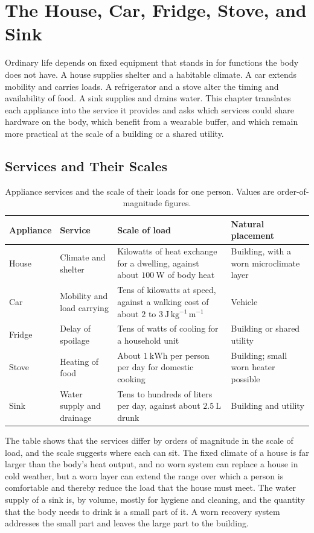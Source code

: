 \documentclass[11pt,openany]{book}
\theoremstyle{definition}
\theoremstyle{remark}
\begin{document}
\chapter{The House, Car, Fridge, Stove, and Sink}
\label{ch:appliances}

Ordinary life depends on fixed equipment that stands in for functions the body does not have. A house supplies shelter and a habitable climate. A car extends mobility and carries loads. A refrigerator and a stove alter the timing and availability of food. A sink supplies and drains water. This chapter translates each appliance into the service it provides and asks which services could share hardware on the body, which benefit from a wearable buffer, and which remain more practical at the scale of a building or a shared utility.

\section{Services and Their Scales}

\begin{table}[ht]
\centering
\caption{Appliance services and the scale of their loads for one person. Values are order-of-magnitude figures.}
\label{tab:services}
\small
\begin{tabular}{@{}p{2.4cm}p{3.1cm}p{4.2cm}p{3.1cm}@{}}
\toprule
Appliance & Service & Scale of load & Natural placement \\
\midrule
House & Climate and shelter & Kilowatts of heat exchange for a dwelling, against about $100\ \mathrm{W}$ of body heat & Building, with a worn microclimate layer \\
Car & Mobility and load carrying & Tens of kilowatts at speed, against a walking cost of about $2$ to $3\ \mathrm{J\,kg^{-1}\,m^{-1}}$ & Vehicle \\
Fridge & Delay of spoilage & Tens of watts of cooling for a household unit & Building or shared utility \\
Stove & Heating of food & About $1\ \mathrm{kWh}$ per person per day for domestic cooking & Building; small worn heater possible \\
Sink & Water supply and drainage & Tens to hundreds of liters per day, against about $2.5\ \mathrm{L}$ drunk & Building and utility \\
\bottomrule
\end{tabular}
\end{table}

The table shows that the services differ by orders of magnitude in the scale of load, and the scale suggests where each can sit. The fixed climate of a house is far larger than the body's heat output, and no worn system can replace a house in cold weather, but a worn layer can extend the range over which a person is comfortable and thereby reduce the load that the house must meet. The water supply of a sink is, by volume, mostly for hygiene and cleaning, and the quantity that the body needs to drink is a small part of it. A worn recovery system addresses the small part and leaves the large part to the building.
\end{document}
